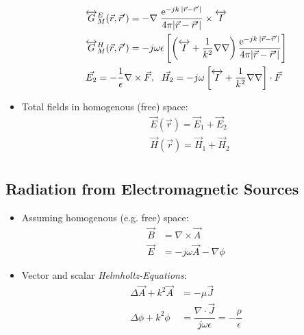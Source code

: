 \begin{itemize}
\begin{align*}
            &\overleftrightarrow{G}^E_M(\vec{r},\vec{r}^\prime) = -\nabla\;\dfrac{\mathrm{e}^{-jk\:|\vec{r} - \vec{r}^\prime|}}{4\pi|\vec{r} - \vec{r}^\prime|} \times \overleftrightarrow{I}\\
            &\overleftrightarrow{G}^H_M(\vec{r},\vec{r}^\prime) = -j\omega\epsilon\left[\left(\overleftrightarrow{I} + \dfrac{1}{k^2}\nabla\nabla\right) \dfrac{\mathrm{e}^{-jk\:|\vec{r} - \vec{r}^\prime|}}{4\pi|\vec{r} - \vec{r}^\prime|}\right]\\
            &\vec{E_2} = -\dfrac{1}{\epsilon} \nabla \times \vec{F},\;\
            \vec{H_2} = -j\omega \left[\overleftrightarrow{I} + \dfrac{1}{k^2}\nabla\nabla\right] \cdot \vec{F}
        \end{align*}
    \item Total fields in homogenous (free) space:
        \begin{align*}
            &\vec{E}(\vec{r}) = \vec{E}_1 + \vec{E}_2\\
            &\vec{H}(\vec{r}) = \vec{H}_1 + \vec{H}_2\\
        \end{align*}
\end{itemize}

\subsection{Radiation from Electromagnetic Sources}
\begin{itemize}
    \itemsep0pt
    \item Assuming homogenous (e.g. free) space:
        \begin{align*}
            \vec{B} &= \nabla\times\vec{A}\\
            \vec{E} &= -j\omega\vec{A} - \nabla\phi
        \end{align*}
    \item Vector and scalar \textit{Helmholtz-Equations}:
        \begin{align*}
            \Delta \vec{A} + k^2 \vec{A} &= -\mu \vec{J}\\
            \Delta \phi + k^2 \phi &= \dfrac{\nabla\cdot\vec{J}}{j\omega\epsilon} = -\dfrac{\rho}{\epsilon}
        \end{align*}
\end{itemize}

